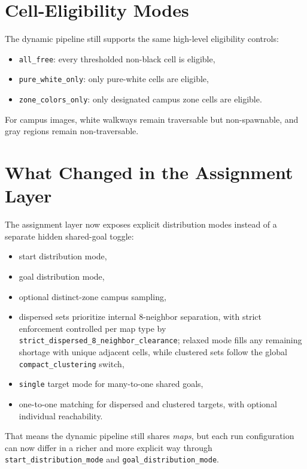 \documentclass[11pt]{article}
\begin{document}
\section{Cell-Eligibility Modes}

The dynamic pipeline still supports the same high-level eligibility controls:
\begin{itemize}[leftmargin=2em]
    \item \texttt{all\_free}: every thresholded non-black cell is eligible,
    \item \texttt{pure\_white\_only}: only pure-white cells are eligible,
    \item \texttt{zone\_colors\_only}: only designated campus zone cells are eligible.
\end{itemize}

For campus images, white walkways remain traversable but non-spawnable, and gray regions remain non-traversable.

\section{What Changed in the Assignment Layer}

The assignment layer now exposes explicit distribution modes instead of a separate hidden shared-goal toggle:
\begin{itemize}[leftmargin=2em]
    \item start distribution mode,
    \item goal distribution mode,
    \item optional distinct-zone campus sampling,
    \item dispersed sets prioritize internal 8-neighbor separation, with strict enforcement controlled per map type by \texttt{strict\_dispersed\_8\_neighbor\_clearance}; relaxed mode fills any remaining shortage with unique adjacent cells, while clustered sets follow the global \texttt{compact\_clustering} switch,
    \item \texttt{single} target mode for many-to-one shared goals,
    \item one-to-one matching for dispersed and clustered targets, with optional individual reachability.
\end{itemize}

That means the dynamic pipeline still shares \emph{maps}, but each run configuration can now differ in a richer and more explicit way through \texttt{start\_distribution\_mode} and \texttt{goal\_distribution\_mode}.
\end{document}

